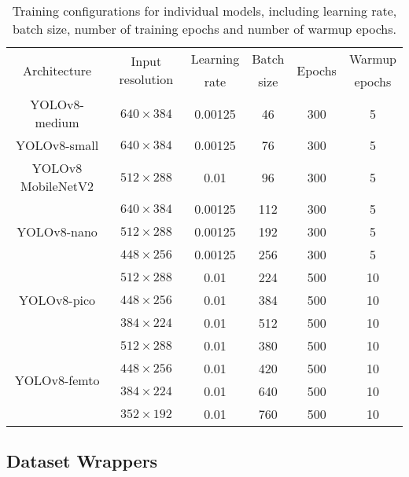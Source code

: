 \begin{table}[h]
\centering
\small
\begin{tabular}{|c|c|c|c|c|c|}
    \hline
    \multirow{2}{*}{Architecture}& \multirow{2}{*}{Input resolution} & Learning & Batch & \multirow{2}{*}{Epochs} & Warmup \\
                                 &                                   & rate     & size  &                         & epochs \\
    \hline
    \hline
    YOLOv8-medium                & $640 \times 384$ & 0.00125 & 46  & 300 & 5 \\
    \hline
    YOLOv8-small                 & $640 \times 384$ & 0.00125 & 76  & 300 & 5 \\
    \hline
    YOLOv8 MobileNetV2           & $512 \times 288$ & 0.01    & 96  & 300 & 5 \\
    \hline
    \multirow{3}{*}{YOLOv8-nano} & $640 \times 384$ & 0.00125 & 112 & 300 & 5 \\
                                 & $512 \times 288$ & 0.00125 & 192 & 300 & 5 \\
                                 & $448 \times 256$ & 0.00125 & 256 & 300 & 5 \\
    \hline
    \multirow{3}{*}{YOLOv8-pico} & $512 \times 288$ & 0.01    & 224 & 500 & 10 \\
                                 & $448 \times 256$ & 0.01    & 384 & 500 & 10 \\
                                 & $384 \times 224$ & 0.01    & 512 & 500 & 10 \\
    \hline
    \multirow{4}{*}{YOLOv8-femto}& $512 \times 288$ & 0.01    & 380 & 500 & 10 \\
                                 & $448 \times 256$ & 0.01    & 420 & 500 & 10 \\
                                 & $384 \times 224$ & 0.01    & 640 & 500 & 10 \\
                                 & $352 \times 192$ & 0.01    & 760 & 500 & 10 \\
    \hline
\end{tabular}
\caption{Training configurations for individual models, including learning rate, batch size, number of training epochs and number of warmup epochs.}
\label{ModelSpecificConfigurations}
\end{table}


\subsection{Dataset Wrappers}

